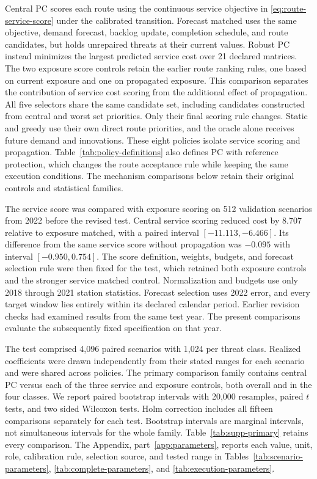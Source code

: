 \documentclass[journal]{IEEEtran}
\begin{document}
Central PC scores each route using the continuous service objective in
\eqref{eq:route-service-score} under the calibrated transition.  Forecast
matched uses the same objective, demand forecast, backlog update, completion
schedule, and route candidates, but holds unrepaired threats at their current
values.  Robust PC instead minimizes the largest predicted service cost over
21 declared matrices.  The two exposure score controls retain the earlier
route ranking rules, one based on current exposure and one on propagated
exposure.  This comparison separates the contribution of service cost scoring
from the additional effect of propagation.  All five selectors share the same
candidate set, including candidates constructed from central and worst set
priorities.  Only their final scoring rule changes.  Static and greedy use
their own direct route priorities, and the oracle alone receives future demand
and innovations.  These eight policies isolate service scoring and propagation.
Table~\ref{tab:policy-definitions} also defines PC with reference protection,
which changes the route acceptance rule while keeping the same execution
conditions.  The mechanism comparisons below retain their original controls
and statistical families.

The service score was compared with exposure scoring on 512 validation
scenarios from 2022 before the revised test.  Central service scoring reduced
cost by 8.707 relative to exposure matched, with a paired interval
$[-11.113,-6.466]$.  Its difference from the same service score without
propagation was $-0.095$ with interval $[-0.950,0.754]$.  The score definition,
weights, budgets, and forecast selection rule were then fixed for the test,
which retained both exposure controls and the stronger service matched control.
Normalization and budgets use only 2018 through 2021 station statistics.
Forecast selection uses 2022 error, and every target window lies entirely
within its declared calendar period.
Earlier revision checks had examined results from the same test year.
The present comparisons evaluate the subsequently fixed specification on that year.

The test comprised 4,096 paired scenarios with 1,024 per threat class.
Realized coefficients were drawn independently from their stated ranges for
each scenario and were shared across policies.  The primary comparison family
contains central PC versus each of the three service and exposure controls,
both overall and in the four classes.  We report paired bootstrap intervals
with 20,000 resamples, paired $t$ tests, and two sided Wilcoxon tests.  Holm
correction includes all fifteen comparisons separately for each test.
Bootstrap intervals are marginal intervals, not simultaneous intervals for the
whole family.  Table~\ref{tab:supp-primary} retains every comparison.
The Appendix, part~\ref{app:parameters}, reports each value, unit, role, calibration rule,
selection source, and tested range in
Tables~\ref{tab:scenario-parameters}, \ref{tab:complete-parameters}, and
\ref{tab:execution-parameters}.
\end{document}
